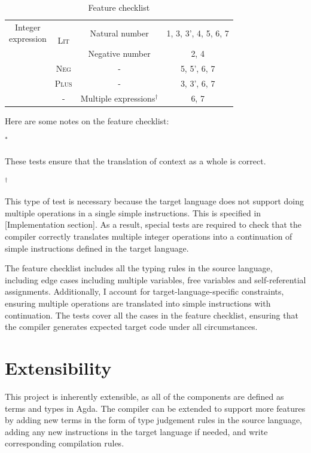 \documentclass[12pt,a4paper]{report}
\theoremstyle{definition}
\begin{document}
\begin{table}[H]
\begin{tabular}{| c | c | c | c |}
            \multirowcell{5}{Integer\\expression} 
                & \multirow{2}{*}{\textsc{Lit}}  
                    & Natural number  & 1, 3, 3', 4, 5, 6, 7 \\ \cline{3-4}
                &   & Negative number & 2, 4 \\ \cline{2-4}
                & \textsc{Neg} & - & 5, 5', 6, 7  \\ \cline{2-4}
                & \textsc{Plus} & - & 3, 3', 6, 7  \\ \cline{2-4}
                & -             & Multiple expressions\hyperlink{note2}{$^{\dagger}$} & 6, 7 \\
            \hline
        \end{tabular}

        \caption{Feature checklist}
        \label{tab: feature_checklist}
    \end{table}

    Here are some notes on the feature checklist:

    \hypertarget{note1}{$^{\ast}$} These tests ensure that the translation of context as a whole is correct.

    \hypertarget{note2}{$^{\dagger}$} This type of test is necessary because the target language does not support doing multiple operations in a single simple instructions. This is specified in [Implementation section]. As a result, special tests are required to check that the compiler correctly translates multiple integer operations into a continuation of simple instructions defined in the target language. 

    \vspace{2.5em}

    The feature checklist includes all the typing rules in the source language, including edge cases including multiple variables, free variables and self-referential assignments. Additionally, I account for target-language-specific constraints, ensuring multiple operations are translated into simple instructions with continuation. The tests cover all the cases in the feature checklist, ensuring that the compiler generates expected target code under all circumstances.

    \section{Extensibility}
    This project is inherently extensible, as all of the components are defined as terms and types in Agda. The compiler can be extended to support more features by adding new terms in the form of type judgement rules in the source language, adding any new instructions in the target language if needed, and write corresponding compilation rules.
\end{document}
